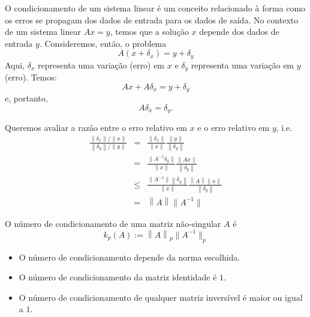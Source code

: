 O condicionamento de um sistema linear é um conceito relacionado à forma como os erros se propagam dos dados de entrada para os dados de saída. No contexto de um sistema linear $Ax=y$, temos que a solução $x$ depende dos dados de entrada $y$. Consideremos, então, o problema
\begin{equation*}
  A(x+\delta_x)=y+\delta_y
\end{equation*}
Aqui, $\delta_x$ representa uma variação (erro) em $x$ e $\delta_y$ representa uma variação em $y$ (erro). Temos:
\begin{equation*}
  Ax+A\delta_x=y+\delta_y
\end{equation*}
e, portanto,
\begin{equation*}
  A\delta_x=\delta_y.
\end{equation*}

Queremos avaliar a razão entre o erro relativo em $x$ e o erro relativo em $y$, i.e.
\begin{eqnarray*}
\frac{\left\|\delta_x\right\|/\left\|x\right\|}{\left\|\delta_y\right\|/\|y\|} &=& \frac{\left\|\delta_x\right\|}{\left\|x\right\|}\frac{\|y\|}{\left\|\delta_y\right\|}\\ 
&=& \frac{\|A^{-1}\delta_y\|}{\left\|x\right\|}\frac{\|Ax\|}{\left\|\delta_y\right\|} \\
&\leq& \frac{\|A^{-1}\|\left\|\delta_y\right\|}{\left\|x\right\|}\frac{\left\|A\right\|\left\|x\right\|}{\left\|\delta_y\right\|}\\
&=& \left\|A\right\|\|A^{-1}\|  
\end{eqnarray*}

\begin{defn} O número de condicionamento de uma matriz não-singular $A$ é
  \begin{equation*}
    k_p(A) := \left\|A\right\|_p \|A^{-1}\|_p  
  \end{equation*}
\end{defn}

\begin{obs}
  \begin{itemize}
  \item O número de condicionamento depende da norma escolhida.
  \item O número de condicionamento da matriz identidade é $1$.
  \item O número de condicionamento de qualquer matriz inversível é maior ou igual a $1$.
  \end{itemize}
\end{obs}


